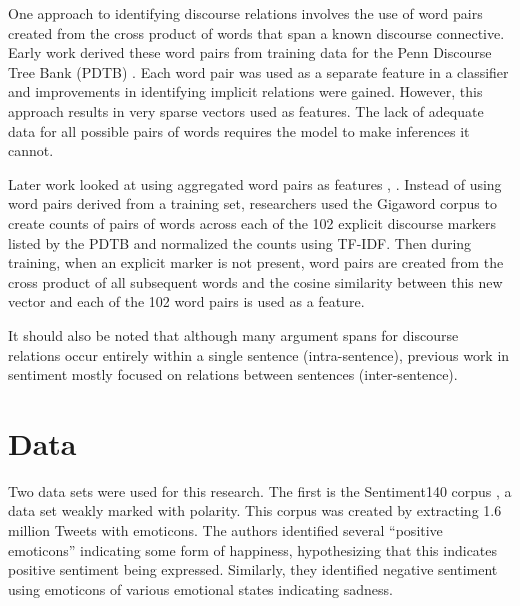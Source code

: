 \documentclass[11pt,letterpaper]{article}
\begin{document}


One approach to identifying discourse relations involves the use of word pairs created from the cross product of words that span a known discourse connective.  
Early work derived these word pairs from training data \cite{Marcu:2001} for the Penn Discourse Tree Bank
(PDTB) \cite{Prasad:2008a}.  Each word pair was used as a separate feature in a classifier and improvements in identifying
implicit relations were gained.  However, this approach results in very sparse vectors used as features.  The lack of adequate data for all possible pairs of words
requires the model to make inferences it cannot.

Later work looked at using aggregated word pairs as features \cite{Biran:2011}, \cite{Biran:2013}.  Instead of using word pairs derived from a training set, researchers used the Gigaword corpus
to create counts of pairs of words across each of the 102 explicit discourse markers listed by the PDTB and normalized the counts using TF-IDF.  Then during training, when
an explicit marker is not present, word pairs are created from the cross product of all subsequent words and the cosine similarity between this new vector and each of the 102
word pairs is used as a feature.

It should also be noted that although many argument spans for discourse relations occur entirely within a single sentence (intra-sentence), previous work in sentiment mostly
focused on relations between sentences (inter-sentence).

\section{Data}
Two data sets were used for this research.  The first is the Sentiment140 corpus \cite{Go}, a data set weakly marked with polarity.  This corpus was created by extracting
1.6 million Tweets with emoticons.  The authors identified several ``positive emoticons'' indicating some form of happiness,
hypothesizing that this indicates
positive sentiment being expressed.  Similarly, they identified negative sentiment using emoticons of various emotional states
indicating sadness.  
\end{document}
